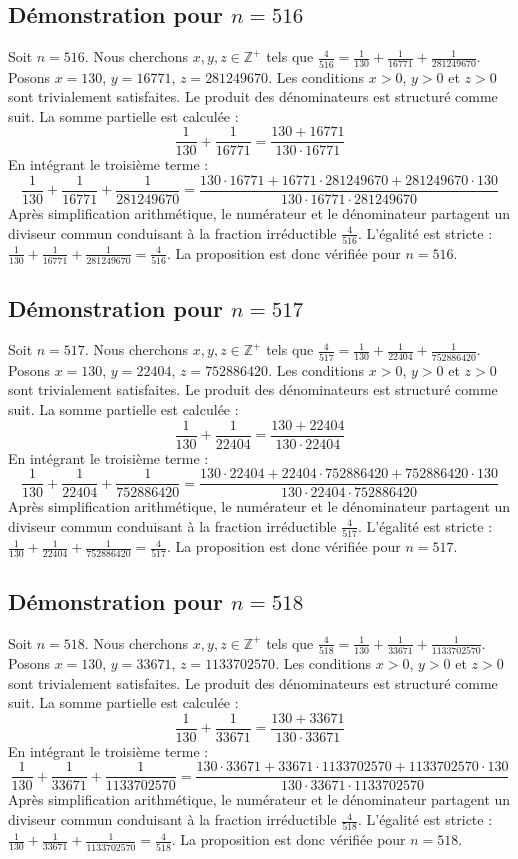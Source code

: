 \documentclass[11pt,a4paper]{article}
\begin{document}
\subsection{Démonstration pour $n = 516$}
Soit $n = 516$. Nous cherchons $x, y, z \in \mathbb{Z}^{+}$ tels que $\frac{4}{516} = \frac{1}{130} + \frac{1}{16771} + \frac{1}{281249670}$.
Posons $x = 130$, $y = 16771$, $z = 281249670$.
Les conditions $x > 0$, $y > 0$ et $z > 0$ sont trivialement satisfaites.
Le produit des dénominateurs est structuré comme suit. La somme partielle est calculée :
$$ \frac{1}{130} + \frac{1}{16771} = \frac{130+16771}{130 \cdot 16771} $$
En intégrant le troisième terme :
$$ \frac{1}{130} + \frac{1}{16771} + \frac{1}{281249670} = \frac{130 \cdot 16771 + 16771 \cdot 281249670 + 281249670 \cdot 130}{130 \cdot 16771 \cdot 281249670} $$
Après simplification arithmétique, le numérateur et le dénominateur partagent un diviseur commun conduisant à la fraction irréductible $\frac{4}{516}$.
L'égalité est stricte : $\frac{1}{130} + \frac{1}{16771} + \frac{1}{281249670} = \frac{4}{516}$.
La proposition est donc vérifiée pour $n = 516$.
\subsection{Démonstration pour $n = 517$}
Soit $n = 517$. Nous cherchons $x, y, z \in \mathbb{Z}^{+}$ tels que $\frac{4}{517} = \frac{1}{130} + \frac{1}{22404} + \frac{1}{752886420}$.
Posons $x = 130$, $y = 22404$, $z = 752886420$.
Les conditions $x > 0$, $y > 0$ et $z > 0$ sont trivialement satisfaites.
Le produit des dénominateurs est structuré comme suit. La somme partielle est calculée :
$$ \frac{1}{130} + \frac{1}{22404} = \frac{130+22404}{130 \cdot 22404} $$
En intégrant le troisième terme :
$$ \frac{1}{130} + \frac{1}{22404} + \frac{1}{752886420} = \frac{130 \cdot 22404 + 22404 \cdot 752886420 + 752886420 \cdot 130}{130 \cdot 22404 \cdot 752886420} $$
Après simplification arithmétique, le numérateur et le dénominateur partagent un diviseur commun conduisant à la fraction irréductible $\frac{4}{517}$.
L'égalité est stricte : $\frac{1}{130} + \frac{1}{22404} + \frac{1}{752886420} = \frac{4}{517}$.
La proposition est donc vérifiée pour $n = 517$.
\subsection{Démonstration pour $n = 518$}
Soit $n = 518$. Nous cherchons $x, y, z \in \mathbb{Z}^{+}$ tels que $\frac{4}{518} = \frac{1}{130} + \frac{1}{33671} + \frac{1}{1133702570}$.
Posons $x = 130$, $y = 33671$, $z = 1133702570$.
Les conditions $x > 0$, $y > 0$ et $z > 0$ sont trivialement satisfaites.
Le produit des dénominateurs est structuré comme suit. La somme partielle est calculée :
$$ \frac{1}{130} + \frac{1}{33671} = \frac{130+33671}{130 \cdot 33671} $$
En intégrant le troisième terme :
$$ \frac{1}{130} + \frac{1}{33671} + \frac{1}{1133702570} = \frac{130 \cdot 33671 + 33671 \cdot 1133702570 + 1133702570 \cdot 130}{130 \cdot 33671 \cdot 1133702570} $$
Après simplification arithmétique, le numérateur et le dénominateur partagent un diviseur commun conduisant à la fraction irréductible $\frac{4}{518}$.
L'égalité est stricte : $\frac{1}{130} + \frac{1}{33671} + \frac{1}{1133702570} = \frac{4}{518}$.
La proposition est donc vérifiée pour $n = 518$.
\end{document}
